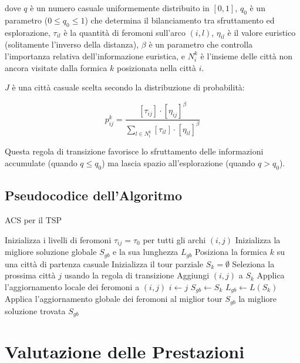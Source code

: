dove $q$ è un numero casuale uniformemente distribuito in $[0,1]$, $q_0$ è un parametro ($0 \le q_0 \le 1$) che determina il bilanciamento tra sfruttamento ed esplorazione, $\tau_{il}$ è la quantità di feromoni sull'arco $(i,l)$, $\eta_{il}$ è il valore euristico (solitamente l'inverso della distanza), $\beta$ è un parametro che controlla l'importanza relativa dell'informazione euristica, e $N_i^k$ è l'insieme delle città non ancora visitate dalla formica $k$ posizionata nella città $i$.

$J$ è una città casuale scelta secondo la distribuzione di probabilità:

\[
	p_{ij}^k = \frac{[\tau_{ij}] \cdot [\eta_{ij}]^\beta}{\sum_{l \in N_i^k} [\tau_{il}] \cdot [\eta_{il}]^\beta}
\]

Questa regola di transizione favorisce lo sfruttamento delle informazioni accumulate (quando $q \leq q_0$) ma lascia spazio all'esplorazione (quando $q > q_0$).

\subsection{Pseudocodice dell'Algoritmo}

\begin{algorithm}
	\caption{\gls{ACS} per il \gls{TSP}}
	\begin{algorithmic}[1]
		\State Inizializza i livelli di feromoni $\tau_{ij} = \tau_0$ per tutti gli archi $(i,j)$
		\State Inizializza la migliore soluzione globale $S_{gb}$ e la sua lunghezza $L_{gb}$
		\State Posiziona la formica $k$ su una città di partenza casuale
		\State Inizializza il tour parziale $S_k = \emptyset$
		\Repeat
		\State Seleziona la prossima città $j$ usando la regola di transizione
		\State Aggiungi $(i,j)$ a $S_k$
		\State Applica l'aggiornamento locale dei feromoni a $(i,j)$
		\State $i \gets j$
		\State $S_{gb} \gets S_k$
		\State $L_{gb} \gets L(S_k)$
		\EndIf
		\EndFor
		\State Applica l'aggiornamento globale dei feromoni al miglior tour $S_{gb}$
		\EndFor
		\State \Return la migliore soluzione trovata $S_{gb}$
	\end{algorithmic}
\end{algorithm}

\section{Valutazione delle Prestazioni}

